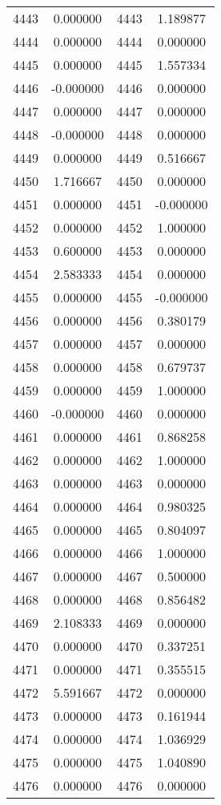 \documentclass[12pt]{article}
\begin{document}
\begin{longtable}{@{}cccc@{}}
4443 & 0.000000 & 4443 & 1.189877 \\
4444 & 0.000000 & 4444 & 0.000000 \\
4445 & 0.000000 & 4445 & 1.557334 \\
4446 & -0.000000 & 4446 & 0.000000 \\
4447 & 0.000000 & 4447 & 0.000000 \\
4448 & -0.000000 & 4448 & 0.000000 \\
4449 & 0.000000 & 4449 & 0.516667 \\
4450 & 1.716667 & 4450 & 0.000000 \\
4451 & 0.000000 & 4451 & -0.000000 \\
4452 & 0.000000 & 4452 & 1.000000 \\
4453 & 0.600000 & 4453 & 0.000000 \\
4454 & 2.583333 & 4454 & 0.000000 \\
4455 & 0.000000 & 4455 & -0.000000 \\
4456 & 0.000000 & 4456 & 0.380179 \\
4457 & 0.000000 & 4457 & 0.000000 \\
4458 & 0.000000 & 4458 & 0.679737 \\
4459 & 0.000000 & 4459 & 1.000000 \\
4460 & -0.000000 & 4460 & 0.000000 \\
4461 & 0.000000 & 4461 & 0.868258 \\
4462 & 0.000000 & 4462 & 1.000000 \\
4463 & 0.000000 & 4463 & 0.000000 \\
4464 & 0.000000 & 4464 & 0.980325 \\
4465 & 0.000000 & 4465 & 0.804097 \\
4466 & 0.000000 & 4466 & 1.000000 \\
4467 & 0.000000 & 4467 & 0.500000 \\
4468 & 0.000000 & 4468 & 0.856482 \\
4469 & 2.108333 & 4469 & 0.000000 \\
4470 & 0.000000 & 4470 & 0.337251 \\
4471 & 0.000000 & 4471 & 0.355515 \\
4472 & 5.591667 & 4472 & 0.000000 \\
4473 & 0.000000 & 4473 & 0.161944 \\
4474 & 0.000000 & 4474 & 1.036929 \\
4475 & 0.000000 & 4475 & 1.040890 \\
4476 & 0.000000 & 4476 & 0.000000 \\

\end{longtable}
\end{document}
